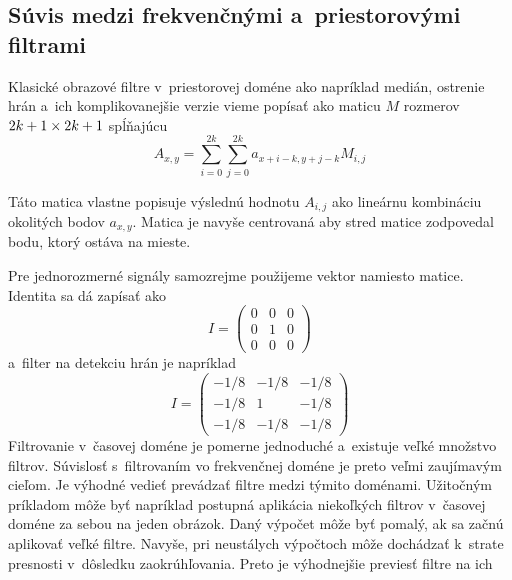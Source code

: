 \subsection{Súvis medzi frekvenčnými a~priestorovými filtrami}
Klasické obrazové filtre v~priestorovej doméne ako napríklad medián, 
ostrenie hrán a~ich komplikovanejšie verzie vieme popísať ako maticu
$M$ rozmerov $2k+1 \times 2k+1$ spĺňajúcu
\begin{equation*}
    A_{x,y} = \sum_{i=0}^{2k} \sum_{j=0}^{2k} a_{x+i-k, y+j-k}
    M_{i,j}
\end{equation*}
\begin{poznamka}
    Táto matica vlastne popisuje výslednú hodnotu $A_{i,j}$ ako
    lineárnu kombináciu okolitých bodov $a_{x,y}$. Matica je navyše
    centrovaná aby stred matice zodpovedal bodu, ktorý ostáva na
    mieste.
\end{poznamka}
Pre jednorozmerné signály samozrejme použijeme vektor namiesto matice.
Identita sa dá zapísať ako 
\begin{equation*}
    I = \begin{pmatrix}
            0 & 0 & 0 \\
            0 & 1 & 0 \\
            0 & 0 & 0
        \end{pmatrix}
\end{equation*}
a~filter na detekciu hrán je napríklad
\begin{equation*}
    I = \begin{pmatrix}
            -1/8 & -1/8 & -1/8 \\
            -1/8 & 1 & -1/8 \\
            -1/8 & -1/8 & -1/8
        \end{pmatrix}
\end{equation*}
Filtrovanie v~časovej doméne je pomerne jednoduché a~existuje veľké
množstvo filtrov. Súvislosť s~filtrovaním vo frekvenčnej doméne je
preto veľmi zaujímavým cieľom. Je výhodné vedieť prevádzať filtre
medzi týmito doménami. Užitočným príkladom môže byť napríklad postupná
aplikácia niekoľkých filtrov v~časovej doméne za sebou na jeden obrázok.
Daný výpočet môže byť pomalý, ak sa začnú aplikovať veľké filtre.
Navyše, pri neustálych výpočtoch môže dochádzať k~strate presnosti 
v~dôsledku zaokrúhľovania. Preto je výhodnejšie previesť filtre na ich
